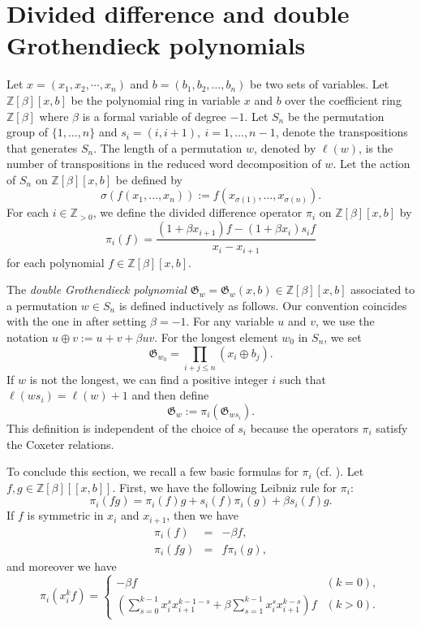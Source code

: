 \documentclass[11pt,reqno,sumlimits]{amsart}
\newcommand{\ZZ}{{\mathbb Z}}
\newcommand{\frakG}{{\mathfrak G}}
\theoremstyle{definition}
\numberwithin{equation}{section}
\begin{document}
\section{Divided difference and double Grothendieck polynomials}\label{S1}
Let $x=(x_1,x_2,\cdots,x_n)$ and $b=(b_1,b_2,\dots,b_n)$ be two sets of variables. Let $\ZZ[\beta][x,b]$ be the polynomial ring in variable $x$ and $b$ over the coefficient ring $\ZZ[\beta]$ where $\beta$ is a formal variable of degree $-1$. Let $S_n$ be the permutation group of $\{1,\dots, n\}$ and $s_i=(i,i+1), \ i=1,\dots, n-1$, denote the transpositions that generates $S_n$. The length of a permutation $w$, denoted by $\ell(w)$, is the number of transpositions in the reduced word decomposition of $w$. Let the action of $S_n$ on $\ZZ[\beta][x,b]$ be defined by
\[
\sigma(f(x_1,\dots, x_n)) := f(x_{\sigma(1)},\dots, x_{\sigma(n)}).
\]
For each $i \in \ZZ_{>0}$, we define the divided difference operator $\pi_i$ on $\ZZ[\beta][x,b]$ by
\[
\pi_i(f) = \frac{(1+\beta x_{i+1}) f - (1+\beta x_i ) s_if }{x_i-x_{i+1}}
\]
for each polynomial $f \in \ZZ[\beta][x,b]$.

The {\it double Grothendieck polynomial} $\frakG_w=\frakG_w(x,b) \in \ZZ[\beta][x,b]$ associated to a permutation $w\in S_n$ is defined inductively as follows. Our convention coincides with the one in \cite{BuchLRrule} after setting $\beta=-1$. For any variable $u$ and $v$, we use the notation $u\oplus v:=u+v+\beta uv$. For the longest element $w_0$ in $S_n$, we set
\[
\frakG_{w_0} = \prod_{i+j\leq n}  (x_i\oplus b_j).
\]
If $w$ is not the longest, we can find a positive integer $i$ such that $\ell(ws_i)=\ell(w) +1$ and then define
\[
\frakG_w:= \pi_i(\frakG_{ws_i}).
\]
This definition is independent of the choice of $s_i$ because the operators $\pi_i$ satisfy the Coxeter relations. 

To conclude this section, we recall a few basic formulas for $\pi_i$  (cf.  \cite[\S2.1]{MatsumuraFlagged}). Let $f, g\in \ZZ[\beta][[x,b]]$. First, we have the following Leibniz rule for $\pi_i$: 
\begin{equation}\label{ddo1}
\pi_i(fg) = \pi_i(f)g + s_i(f)\pi_i(g) + \beta s_i(f)g.
\end{equation}
If $f$ is symmetric in $x_i$ and $x_{i+1}$, then we have
\begin{eqnarray}
\pi_i(f) &=& -\beta f,  \label{ddo2}\\
\pi_i(fg) &=&f\pi_i(g), \label{ddo3}
\end{eqnarray}
and moreover we have
\begin{equation}\label{x^n}
\pi_i(x_i^k f) = 
\begin{cases}
-\beta f& (k=0), \\
\left(\displaystyle\sum_{s=0}^{k-1} x_i^s x_{i+1}^{k-1-s}  + \beta \displaystyle\sum_{s=1}^{k-1} x_i^{s} x_{i+1}^{k-s}\right)f & (k>0).
\end{cases}
\end{equation}
\end{document}
